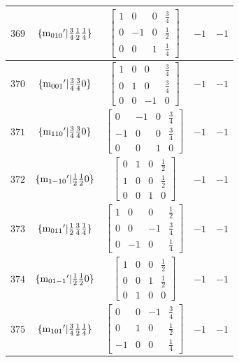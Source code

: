 \documentclass[fleqn,8pt]{jsarticle}
\begin{document}
\begin{longtable}{ccccc}
$ 369 $ & $ \{{\rm m}_{010}{}'|\frac{3}{4} \frac{1}{2} \frac{1}{4}\} $ & $ \begin{bmatrix} 1 & 0 & 0 & \frac{3}{4} \\ 0 & -1 & 0 & \frac{1}{2} \\ 0 & 0 & 1 & \frac{1}{4} \end{bmatrix} $ & $ -1 $ & $ -1 $ \\ \hline
$ 370 $ & $ \{{\rm m}_{001}{}'|\frac{3}{4} \frac{3}{4} 0\} $ & $ \begin{bmatrix} 1 & 0 & 0 & \frac{3}{4} \\ 0 & 1 & 0 & \frac{3}{4} \\ 0 & 0 & -1 & 0 \end{bmatrix} $ & $ -1 $ & $ -1 $ \\ \hline
$ 371 $ & $ \{{\rm m}_{110}{}'|\frac{3}{4} \frac{3}{4} 0\} $ & $ \begin{bmatrix} 0 & -1 & 0 & \frac{3}{4} \\ -1 & 0 & 0 & \frac{3}{4} \\ 0 & 0 & 1 & 0 \end{bmatrix} $ & $ -1 $ & $ -1 $ \\ \hline
$ 372 $ & $ \{{\rm m}_{1-10}{}'|\frac{1}{2} \frac{1}{2} 0\} $ & $ \begin{bmatrix} 0 & 1 & 0 & \frac{1}{2} \\ 1 & 0 & 0 & \frac{1}{2} \\ 0 & 0 & 1 & 0 \end{bmatrix} $ & $ -1 $ & $ -1 $ \\ \hline
$ 373 $ & $ \{{\rm m}_{011}{}'|\frac{1}{2} \frac{3}{4} \frac{1}{4}\} $ & $ \begin{bmatrix} 1 & 0 & 0 & \frac{1}{2} \\ 0 & 0 & -1 & \frac{3}{4} \\ 0 & -1 & 0 & \frac{1}{4} \end{bmatrix} $ & $ -1 $ & $ -1 $ \\ \hline
$ 374 $ & $ \{{\rm m}_{01-1}{}'|\frac{1}{2} \frac{1}{2} 0\} $ & $ \begin{bmatrix} 1 & 0 & 0 & \frac{1}{2} \\ 0 & 0 & 1 & \frac{1}{2} \\ 0 & 1 & 0 & 0 \end{bmatrix} $ & $ -1 $ & $ -1 $ \\ \hline
$ 375 $ & $ \{{\rm m}_{101}{}'|\frac{3}{4} \frac{1}{2} \frac{1}{4}\} $ & $ \begin{bmatrix} 0 & 0 & -1 & \frac{3}{4} \\ 0 & 1 & 0 & \frac{1}{2} \\ -1 & 0 & 0 & \frac{1}{4} \end{bmatrix} $ & $ -1 $ & $ -1 $ \\ \hline

\end{longtable}
\end{document}
